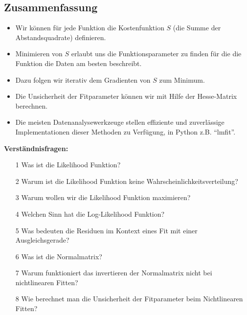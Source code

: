 \subsection{Zusammenfassung}
\label{subsec:vl9-4}

\begin{itemize}
    \setlength\itemsep{0em}
        \item Wir können für jede Funktion die Kostenfunktion $S$ (die Summe der Abstandsquadrate) definieren.
        \item Minimieren von $S$ erlaubt uns die Funktionsparameter zu finden für die die Funktion die Daten am besten beschreibt.
        \item Dazu folgen wir iterativ dem Gradienten von $S$ zum Minimum.
        \item Die Unsicherheit der Fitparameter können wir mit Hilfe der Hesse-Matrix berechnen.
        \item Die meisten Datenanalysewerkzeuge stellen effiziente und zuverlässige Implementationen dieser Methoden zu Verfügung, in Python z.B. ``lmfit''.
\end{itemize}


\newpage

\begin{tcolorbox}[enhanced,width=6in,
    fontupper=\small,drop fuzzy shadow southwest,
    colframe=black!50!black,colback=black!5]
\textbf{Verständnisfragen:} \\
\begin{enumerate}
\item[1] Was ist die Likelihood Funktion?
\item[2] Warum ist die Likelihood Funktion keine Wahrscheinlichkeitsverteilung? 
\item[3] Warum wollen wir die Likelihood Funktion maximieren? 
\item[4] Welchen Sinn hat die Log-Likelihood Funktion? 
\item[5] Was bedeuten die Residuen im Kontext eines Fit mit einer Ausgleichsgerade? 
\item[6] Was ist die Normalmatrix? 
\item[7] Warum funktioniert das invertieren der Normalmatrix nicht bei nichtlinearen Fitten? 
\item[8] Wie berechnet man die Unsicherheit der Fitparameter beim Nichtlinearen Fitten? 
\end{enumerate}
\end{tcolorbox}

